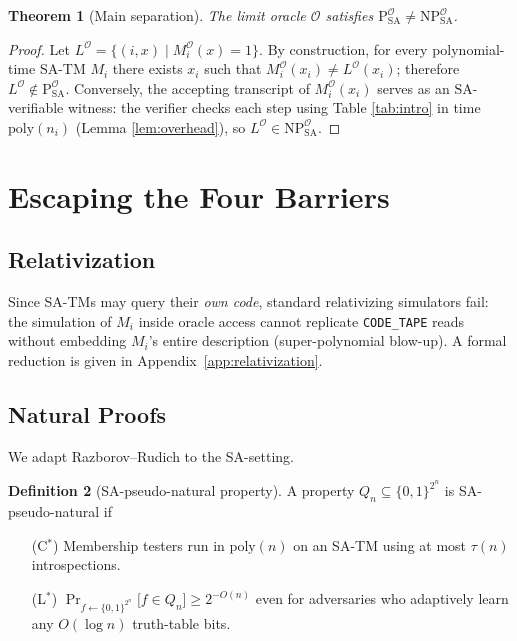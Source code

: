 \documentclass[12pt]{article}
\newcommand{\classP}{\mathrm{P}}
\newcommand{\classNP}{\mathrm{NP}}
\newcommand{\SA}{\mathrm{SA}}
\newcommand{\OO}{\mathcal{O}}
\newcommand{\poly}{\mathrm{poly}}
\theoremstyle{definition}
\newtheorem{definition}{Definition}[section]
\theoremstyle{plain}
\newtheorem{theorem}[definition]{Theorem}
\theoremstyle{remark}
\begin{document}
\begin{theorem}[Main separation]\label{thm:main-sep}
The limit oracle \(\OO\) satisfies
\(\classP^{\OO}_{\SA}\neq\classNP^{\OO}_{\SA}\).
\end{theorem}

\begin{proof}
Let \(L^\OO=\{(i,x)\mid M_i^{\OO}(x)=1\}\).
By construction, for every polynomial-time SA-TM \(M_i\)
there exists \(x_i\) such that \(M_i^{\OO}(x_i)\neq L^\OO(x_i)\);
therefore \(L^\OO\notin\classP^{\OO}_{\SA}\).
Conversely, the accepting transcript of
\(M_i^{\OO}(x_i)\) serves as an \(\SA\)-verifiable witness:
the verifier checks each step using Table \ref{tab:intro}
in time \(\poly(n_i)\) (Lemma \ref{lem:overhead}),
so \(L^\OO\in\classNP^{\OO}_{\SA}\).
\end{proof}

\section{Escaping the Four Barriers}

\subsection{Relativization}\label{subsec:relativization}

Since SA-TMs may query their \emph{own code},
standard relativizing simulators fail:
the simulation of \(M_i\) inside oracle access cannot
replicate \texttt{CODE\_TAPE} reads without embedding
\(M_i\)'s entire description (super-polynomial blow-up).
A formal reduction is given in Appendix~\ref{app:relativization}.

\subsection{Natural Proofs}\label{subsec:natural}

We adapt Razborov–Rudich to the SA-setting.

\begin{definition}[SA-pseudo-natural property]\label{def:pseudo}
A property \(Q_n\subseteq\{0,1\}^{2^n}\) is SA-pseudo-natural if
\begin{enumerate}
  \item[(C\(^*\))] Membership testers run in \(\poly(n)\)
        on an SA-TM using at most \(\tau(n)\) introspections.
  \item[(L\(^*\))] \(\Pr_{f\leftarrow\{0,1\}^{2^n}}\bigl[f\in Q_n\bigr]
        \ge 2^{-O(n)}\) even for adversaries
        who adaptively learn any \(O(\log n)\) truth-table bits.
\end{enumerate}
\end{definition}
\end{document}
